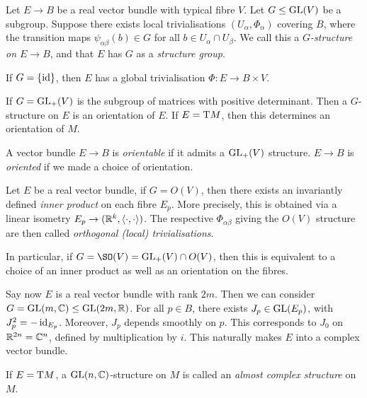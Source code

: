 \documentclass{article}
\begin{document}
\begin{definition}
    Let \(E \to B\) be a real vector bundle with typical fibre \(V\). Let \(G \le \operatorname{GL}(V)\) be a subgroup. Suppose there exists local trivialisations \((U_\alpha, \Phi_\alpha)\) covering \(B\), where the transition maps \(\psi_{\alpha\beta}(b) \in G\) for all \(b \in U_\alpha \cap U_\beta\). We call this a \emph{\(G\)-structure on \(E \to B\)}, and that \(E\) has \(G\) as a \emph{structure group}.
\end{definition}

\begin{example}
    If \(G = \{\operatorname{id}\}\), then \(E\) has a global trivialisation \(\Phi : E \to B \times V\).
    
    If \(G = \operatorname{GL}_+(V)\) is the subgroup of matrices with positive determinant. Then a \(G\)-structure on \(E\) is an orientation of \(E\). If \(E = \mathrm{T} M\), then this determines an orientation of \(M\).
\end{example}

\begin{definition}
     A vector bundle \(E \to B\) is \emph{orientable} if it admits a \(\operatorname{GL}_+(V)\) structure. \(E \to B\) is \emph{oriented} if we made a choice of orientation.
\end{definition}

\lec

\begin{example}
     Let \(E\) be a real vector bundle, if \(G = O(V)\), then there exists an invariantly defined \emph{inner product} on each fibre \(E_p\). More precisely, this is obtained via a linear isometry \(E_p \to (\mathbb{R}^k, \left\langle \cdot, \cdot \right\rangle)\). The respective \(\Phi_{\alpha\beta}\) giving the \(O(V)\) structure are then called \emph{orthogonal (local) trivialisations}.

    In particular, if \(G = \SO(V) = \GL_+(V) \cap O(V)\), then this is equivalent to a choice of an inner product as well as an orientation on the fibres. 
\end{example}

\begin{example}
    Say now \(E\) is a real vector bundle with rank \(2m\). Then we can consider \(G = \operatorname{GL}(m, \mathbb{C}) \le \operatorname{GL}(2m, \mathbb{R})\). For all \(p \in B\), there exists \(J_p \in \operatorname{GL}(E_p)\), with \(J_p^2 = -\operatorname{id}_{E_p}\). Moreover, \(J_p\) depends smoothly on \(p\). This corresponds to \(J_0\) on \(\mathbb{R}^{2n} = \mathbb{C}^n\), defined by multiplication by \(i\). This naturally makes \(E\) into a complex vector bundle.

    If \(E = \mathrm{T} M\), a \(\operatorname{GL}(n, \mathbb{C})\)-structure on \(M\) is called an \emph{almost complex structure} on \(M\).
\end{example}
\end{document}
